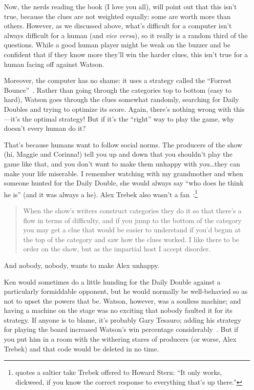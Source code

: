 Now, the \jeopardy{} nerds reading the book (I love you all), will
point out that this isn't true, because the clues are not weighted
equally: some are worth more than others.
%
However, as we discussed above, what's difficult for a computer isn't
always difficult for a human (and \textit{vice versa}), so it really
is a random third of the questions.
%
While a good human player might be weak on the buzzer and be confident
that if they know more they'll win the harder clues, this isn't true
for a human facing off against Watson.

Moreover, the computer has no shame: it uses a strategy called the
``Forrest Bounce''~\citep[more infamously associated with James Holzhauer
and Arthur Chu]{rogak-20}.
%
Rather than going through the categories top to bottom (easy to hard),
Watson goes through the clues somewhat randomly, searching for Daily
Doubles and trying to optimize its score.
%
Again, there's nothing wrong with this---it's the optimal strategy!
%
But if it's the ``right'' way to play the game, why doesn't every
human do it?

That's because humans want to follow social norms.
%
The producers of the show (hi, Maggie and Corinna!) tell you up and
down that you shouldn't play the game like that, and you don't want to
make them unhappy with you\dots they can make your life miserable.
%
I remember watching \jeopardy{} with my grandmother and when someone
hunted for the Daily Double, she would always say ``who does he think
he is'' (and it was always a he).
%
Alex Trebek also wasn't a
fan~\citep{marchese-18}:\footnote{\citet{rogak-20} quotes a saltier
  take Trebek offered to Howard Stern: ``It only works, dickweed, if
  you know the correct response to everything that's up there.''}
%
\begin{quote}
  When the show's writers construct categories they do it so that
  there's a flow in terms of difficulty, and if you jump to the bottom
  of the category you may get a clue that would be easier to
  understand if you'd begun at the top of the category and saw how the
  clues worked. I like there to be order on the show, but as the
  impartial host I accept disorder.
\end{quote}
%
And nobody, nobody, wants to make Alex unhappy.

Ken would sometimes do a little hunding for the Daily Double against a
particularly formiddable opponent, but he would normally be
well-behavied so as not to upset the powers that be.
%
Watson, however, was a soulless machine; and having a machine on the
stage was no exciting that
nobody faulted it for its strategy.
%
If anyone is to blame, it's probably Gary Tesauro; adding his
strategy for playing the board increased Watson's win percentage
considerably~\citep{tesauro-13}.
%
But if you put him in a room with the withering stares of \jeopardy{}
producers (or worse, Alex Trebek) and that code would be deleted in no
time.


